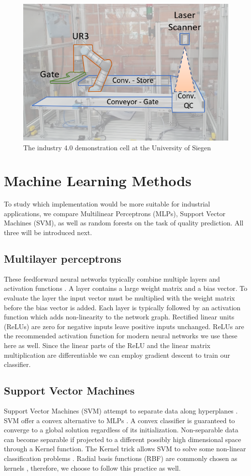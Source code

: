 \documentclass[5p,times,procedia]{elsarticle}
\begin{document}
\begin{figure}
       \includegraphics[width=.45\textwidth]{img/demozelle}
       \caption{The industry 4.0 demonstration cell at the University of Siegen}
\label{fig:ind_cell}
\end{figure}

\section{Machine Learning Methods} \label{sec:ML} %

To study which implementation would be more suitable for industrial applications, we compare Multilinear Perceptrons (MLPs), Support Vector Machines (SVM), as well as random forests on the task of quality prediction. All three will be introduced next.

\subsection{Multilayer perceptrons}
These feedforward neural networks typically combine multiple layers
and activation functions \cite{bishop2006pattern}.
A layer contains a large weight matrix and
a bias vector. To evaluate the layer the input vector must be
multiplied with the weight matrix before the bias vector is added.
Each layer is typically followed by an activation function 
which adds non-linearity to the network graph. Rectified linear units
(ReLUs) are zero for negative inputs leave positive inputs unchanged.
ReLUs are the recommended activation function for modern neural
networks \cite{goodfellow2016deep} we use these here as well.
Since the linear parts of the ReLU and the linear matrix multiplication
are differentiable we can employ gradient descent to train our 
classifier.

\subsection{Support Vector Machines}
Support Vector Machines (SVM) attempt to separate data
along hyperplanes \cite{aggarwal2015data}. 
SVM offer a convex alternative to MLPs \cite{Suykens2002least}.
A convex classifier is guaranteed to converge to a global solution
regardless of its initialization.
Non-separable data can become separable if projected to a different
possibly high dimensional space through a Kernel function.
The Kernel trick allows SVM to solve some non-linear
classification problems \cite{Suykens2002least}.
Radial basis functions (RBF) are commonly chosen as kernels
\cite{Suykens2002least}, therefore, we choose to follow this practice as well.
\end{document}
